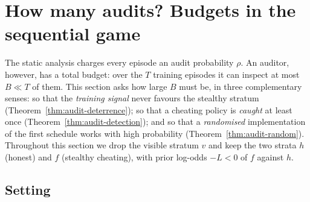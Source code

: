 \documentclass[11pt,a4paper]{article}
\newcommand{\E}{\mathbb{E}}
\newcommand{\Prob}{\mathbb{P}}
\newcommand{\DKL}{D_{\mathrm{KL}}}
\begin{document}
\section{How many audits? Budgets in the sequential game}
\label{sec:audit-budget}

The static analysis charges every episode an audit probability $\rho$. An
auditor, however, has a total budget: over the $T$ training episodes it can
inspect at most $B\ll T$ of them. This section asks how large $B$ must be, in
three complementary senses: so that the \emph{training signal} never favours
the stealthy stratum (Theorem~\ref{thm:audit-deterrence}); so that a cheating
policy is \emph{caught} at least once
(Theorem~\ref{thm:audit-detection}); and so that a \emph{randomised}
implementation of the first schedule works with high probability
(Theorem~\ref{thm:audit-random}). Throughout this section we drop the visible
stratum $v$ and keep the two strata $h$ (honest) and $f$ (stealthy cheating),
with prior log-odds $-L<0$ of $f$ against $h$.

\subsection{Setting}
\end{document}

